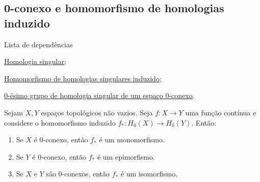 \subsection{0-conexo e homomorfismo de homologias induzido} %
\label{0-conexo-e-homomorfismo-de-homologia-induzido-prop}
\begin{titlemize}{Lista de dependências}
    \item \hyperref[homologia-singular-def]{Homologia singular};\\
    \item \hyperref[homomorfismo-de-homologias-singulares-induzido-prop]{Homomorfismo de homologias singulares induzido};\\
    \item \hyperref[0-esimo-grupo-de-homologia-de-espaco-zero-conexo-prop]{0-ésimo grupo de homologia singular de um espaço 0-conexo}.
\end{titlemize}

\begin{prop}
    Sejam $X,Y$ espaços topológicos não vazios. Seja $f:X\rightarrow Y$ uma função contínua e considere o homomorfismo induzido $f_*:H_0(X)\rightarrow H_0(Y)$. Então:
    \begin{enumerate}
        \item Se $X$ é 0-conexo, então $f_*$ é um monomorfismo.
        \item Se $Y$ é 0-conexo, então $f_*$ é um epimorfismo.
        \item Se $X$ e $Y$ são 0-conexos, então $f_*$ é um isomorfismo.
    \end{enumerate}
\end{prop}

